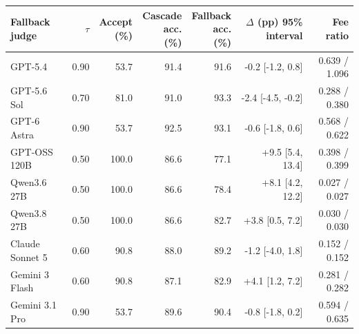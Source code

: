\begin{tabular}{@{}lrrrrrr@{}}
\toprule
Fallback judge & $\tau$ & \shortstack{Accept\\(\%)} & \shortstack{Cascade\\acc. (\%)} & \shortstack{Fallback\\acc. (\%)} & \shortstack{$\Delta$ (pp)\\95\% interval} & \shortstack{Fee\\ratio} \\
\midrule
GPT-5.4 & 0.90 & 53.7 & 91.4 & 91.6 & -0.2 [-1.2, 0.8] & 0.639 / 1.096 \\
GPT-5.6 Sol & 0.70 & 81.0 & 91.0 & 93.3 & -2.4 [-4.5, -0.2] & 0.288 / 0.380 \\
GPT-6 Astra & 0.90 & 53.7 & 92.5 & 93.1 & -0.6 [-1.8, 0.6] & 0.568 / 0.622 \\
GPT-OSS 120B & 0.50 & 100.0 & 86.6 & 77.1 & +9.5 [5.4, 13.4] & 0.398 / 0.399 \\
Qwen3.6 27B & 0.50 & 100.0 & 86.6 & 78.4 & +8.1 [4.2, 12.2] & 0.027 / 0.027 \\
Qwen3.8 27B & 0.50 & 100.0 & 86.6 & 82.7 & +3.8 [0.5, 7.2] & 0.030 / 0.030 \\
Claude Sonnet 5 & 0.60 & 90.8 & 88.0 & 89.2 & -1.2 [-4.0, 1.8] & 0.152 / 0.152 \\
Gemini 3 Flash & 0.60 & 90.8 & 87.1 & 82.9 & +4.1 [1.2, 7.2] & 0.281 / 0.282 \\
Gemini 3.1 Pro & 0.90 & 53.7 & 89.6 & 90.4 & -0.8 [-1.8, 0.2] & 0.594 / 0.635 \\
\bottomrule
\end{tabular}

